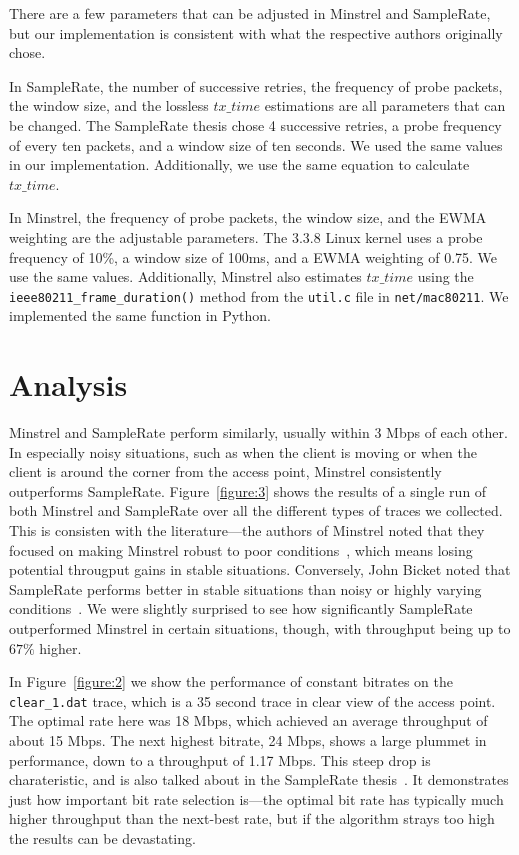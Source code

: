 \documentclass[letterpaper,twocolumn,10pt]{article}
\begin{document}
There are a few parameters that can be adjusted in Minstrel and
SampleRate, but our implementation is consistent with what the
respective authors originally chose.

In SampleRate, the number of successive retries, the frequency of
probe packets, the window size, and the lossless $tx\_time$
estimations are all parameters that can be changed. The SampleRate
thesis chose 4 successive retries, a probe frequency of every ten
packets, and a window size of ten seconds. We used the same values in
our implementation. Additionally, we use the same equation to
calculate $tx\_time$.

In Minstrel, the frequency of probe packets, the window size, and the
EWMA weighting are the adjustable parameters. The 3.3.8 Linux kernel
uses a probe frequency of 10\%, a window size of 100ms, and a EWMA
weighting of 0.75. We use the same values. Additionally, Minstrel also
estimates $tx\_time$ using the \texttt{ieee80211\_frame\_duration()}
method from the \texttt{util.c} file in \texttt{net/mac80211}. We
implemented the same function in Python.


\section{Analysis} \label{sec:analysis}

Minstrel and SampleRate perform similarly, usually within 3 Mbps of
each other. In especially noisy situations, such as when the client is
moving or when the client is around the corner from the access point,
Minstrel consistently outperforms SampleRate. Figure~\ref{figure:3}
shows the results of a single run of both Minstrel and SampleRate over
all the different types of traces we collected. This is consisten with
the literature---the authors of Minstrel noted that they focused on
making Minstrel robust to poor conditions~\cite{minstrel}, which means
losing potential througput gains in stable situations. Conversely,
John Bicket noted that SampleRate performs better in stable situations
than noisy or highly varying conditions~\cite{samplerate}. We were
slightly surprised to see how significantly SampleRate outperformed
Minstrel in certain situations, though, with throughput being up to
$67\%$ higher.

In Figure~\ref{figure:2} we show the performance of constant bitrates
on the \texttt{clear\_1.dat} trace, which is a 35 second trace in
clear view of the access point. The optimal rate here was 18 Mbps,
which achieved an average throughput of about 15 Mbps. The next
highest bitrate, 24 Mbps, shows a large plummet in performance, down
to a throughput of 1.17 Mbps. This steep drop is charateristic, and is
also talked about in the SampleRate thesis~\cite{samplerate}. It
demonstrates just how important bit rate selection is---the optimal
bit rate has typically much higher throughput than the next-best rate,
but if the algorithm strays too high the results can be devastating.
\end{document}
